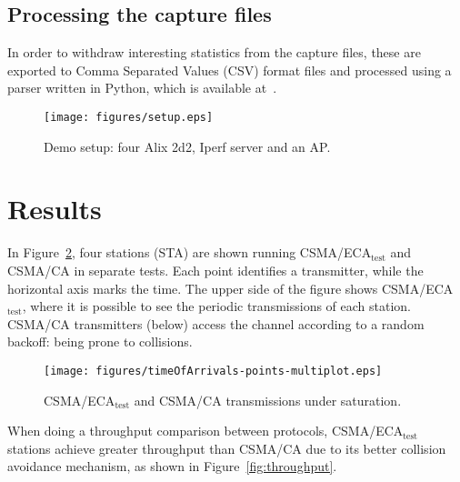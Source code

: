 \documentclass[conference]{IEEEtran}
\begin{document}
	\subsection{Processing the capture files}
	In order to withdraw interesting statistics from the capture files, these are exported to Comma Separated Values (CSV) format files and processed using a parser written in Python, which is available at~\cite{pcapParser}.
	
	\begin{figure}[htbp]
		\centering
		\texttt{[image: figures/setup.eps]}
		\caption{Demo setup: four Alix 2d2, Iperf server and an AP.}
		\label{fig:setup}
	\end{figure}
	
\section{Results}\label{results}
In Figure~\ref{fig:ECA-test}, four stations (STA) are shown running CSMA/ECA$_{\text{test}}$ and CSMA/CA in separate tests. Each point identifies a transmitter, while the horizontal axis marks the time. The upper side of the figure shows CSMA/ECA$_{\text{test}}$, where it is possible to see the periodic transmissions of each station. CSMA/CA transmitters (below) access the channel according to a random backoff: being prone to collisions. 


	\begin{figure}[htbp]
		\centering
		\texttt{[image: figures/timeOfArrivals-points-multiplot.eps]}
		\caption{CSMA/ECA$_{\text{test}}$ and CSMA/CA transmissions under saturation.}
		\label{fig:ECA-test}
	\end{figure}

When doing a throughput comparison between protocols, CSMA/ECA$_{\text{test}}$ stations achieve greater throughput than CSMA/CA due to its better collision avoidance mechanism, as shown in Figure~\ref{fig:throughput}.
\end{document}
